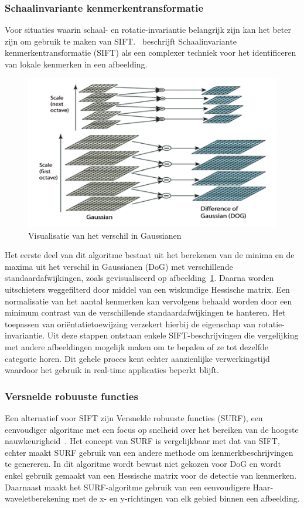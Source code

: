\subsubsection{Schaalinvariante kenmerkentransformatie}
Voor situaties waarin schaal- en rotatie-invariantie belangrijk zijn kan het beter zijn om gebruik te maken van SIFT\@.
\textcite{Tamara2022}~beschrijft Schaalinvariante kenmerkentransformatie (SIFT) als een complexer techniek voor het identificeren van lokale kenmerken in een afbeelding.
\begin{figure}
    \includegraphics[width=1\linewidth]{images/DoG}
    \caption{Visualisatie van het verschil in Gaussianen~\autocite{Lowe2004}}
    \label{fig:difference-of-gaussian}
\end{figure}
Het eerste deel van dit algoritme bestaat uit het berekenen van de minima en de maxima uit het verschil in Gaussianen (DoG) met verschillende standaardafwijkingen, zoals gevisualiseerd op afbeelding~\ref{fig:difference-of-gaussian}.
Daarna worden uitschieters weggefilterd door middel van een wiskundige Hessische matrix.
Een normalisatie van het aantal kenmerken kan vervolgens behaald worden door een minimum contrast van de verschillende standaardafwijkingen te hanteren.
Het toepassen van ori\"entatietoewijzing verzekert hierbij de eigenschap van rotatie-invariantie.
Uit deze stappen ontstaan enkele SIFT-beschrijvingen die vergelijking met andere afbeeldingen mogelijk maken om te bepalen of ze tot dezelfde categorie horen.
Dit gehele proces kent echter aanzienlijke verwerkingstijd waardoor het gebruik in real-time applicaties beperkt blijft.

\subsubsection{Versnelde robuuste functies}
Een alternatief voor SIFT zijn Versnelde robuuste functies (SURF), een eenvoudiger algoritme met een focus op snelheid over het bereiken van de hoogste nauwkeurigheid~\autocite{Wu2013}.
Het concept van SURF is vergelijkbaar met dat van SIFT, echter maakt SURF gebruik van een andere methode om kenmerkbeschrijvingen te genereren.
In dit algoritme wordt bewust niet gekozen voor DoG en wordt enkel gebruik gemaakt van een Hessische matrix voor de detectie van kenmerken.
Daarnaast maakt het SURF-algoritme gebruik van een eenvoudigere Haar-waveletberekening met de x- en y-richtingen van elk gebied binnen een afbeelding.

